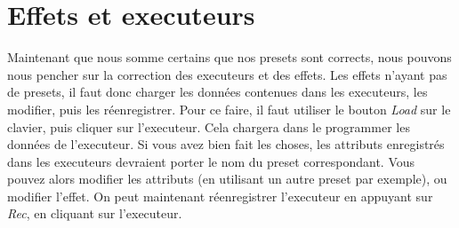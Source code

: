 \section{Effets et executeurs}
\label{sec:adapter_exec}

Maintenant que nous somme certains que nos presets sont corrects, nous pouvons nous
pencher sur la correction des executeurs et des effets.
Les effets n'ayant pas de presets, il faut donc charger les données contenues dans les executeurs, les modifier, puis les réenregistrer.
\newline
Pour ce faire, il faut utiliser le bouton \textit{Load} sur le clavier, puis cliquer sur l'executeur. Cela chargera dans le programmer les données de l'executeur.
\newline
Si vous avez bien fait les choses, les attributs enregistrés dans les executeurs devraient porter le nom du preset correspondant.
Vous pouvez alors modifier les attributs (en utilisant un autre preset par exemple), ou modifier l'effet. On peut maintenant réenregistrer l'executeur en appuyant sur \textit{Rec}, en cliquant sur l'executeur.

